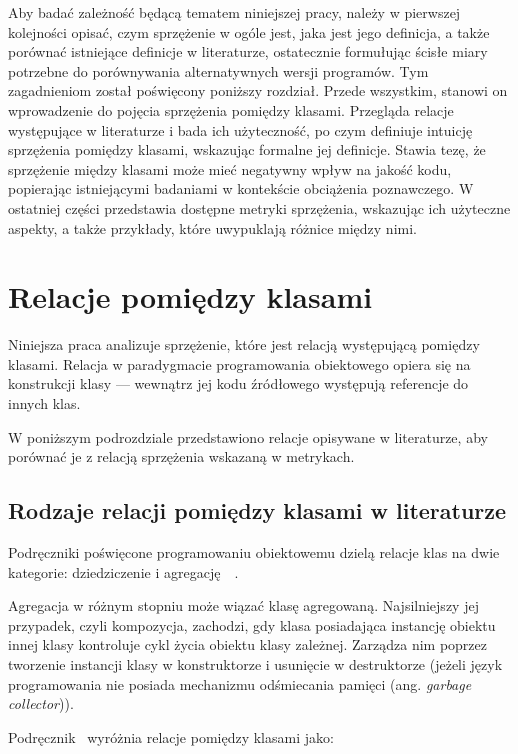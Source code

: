 Aby badać zależność będącą tematem niniejszej pracy, należy w pierwszej kolejności opisać, czym sprzężenie w
ogóle jest, jaka jest jego definicja, a także porównać istniejące definicje w literaturze, ostatecznie formułując
ścisłe miary potrzebne do porównywania alternatywnych wersji programów.
Tym zagadnieniom został poświęcony poniższy rozdział.
Przede wszystkim, stanowi on wprowadzenie do pojęcia sprzężenia pomiędzy klasami.
Przegląda relacje występujące w literaturze i bada ich użyteczność, po czym definiuje intuicję sprzężenia pomiędzy
klasami, wskazując formalne jej definicje.
Stawia tezę, że sprzężenie między klasami może mieć negatywny wpływ na jakość kodu, popierając istniejącymi
badaniami w kontekście obciążenia poznawczego.
W ostatniej części przedstawia dostępne metryki sprzężenia, wskazując ich użyteczne aspekty, a także
przykłady, które uwypuklają różnice między nimi.

\section{Relacje pomiędzy klasami}
Niniejsza praca analizuje sprzężenie, które jest relacją występującą pomiędzy klasami.
Relacja w paradygmacie programowania obiektowego opiera się na konstrukcji klasy --- wewnątrz jej kodu źródłowego
występują referencje do innych klas.

W poniższym podrozdziale przedstawiono relacje opisywane w literaturze, aby porównać je z relacją sprzężenia
wskazaną w metrykach.

\subsection{Rodzaje relacji pomiędzy klasami w literaturze}
\label{subsec:relations}

Podręczniki poświęcone programowaniu obiektowemu dzielą relacje klas na dwie kategorie:
dziedziczenie i agregację~\cite{wegner1990concepts,olsen2007design,wiener1988introduction}~.

Agregacja w różnym stopniu może wiązać klasę agregowaną.
Najsilniejszy jej przypadek, czyli kompozycja, zachodzi, gdy klasa posiadająca instancję obiektu innej klasy kontroluje
cykl życia obiektu klasy zależnej.
Zarządza nim poprzez tworzenie instancji klasy w konstruktorze i usunięcie w destruktorze (jeżeli język
programowania nie posiada mechanizmu odśmiecania pamięci (ang. \textit{garbage collector})).

Podręcznik~\cite{Wiener_Pinson_2000} wyróżnia relacje pomiędzy klasami jako:

